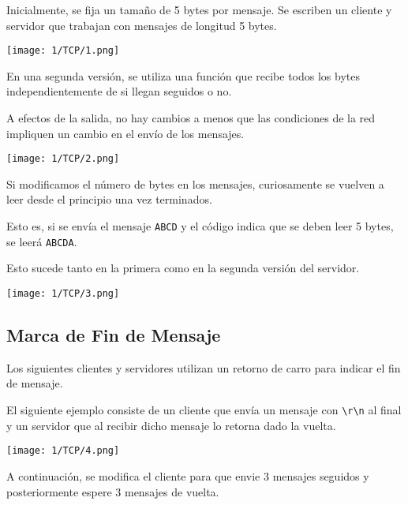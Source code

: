 Inicialmente, se fija un tamaño de 5 bytes por mensaje.
Se escriben un cliente y servidor que trabajan con mensajes de longitud 5 bytes.

\begin{minipage}{\linewidth}
	\centering
	\texttt{[image: 1/TCP/1.png]}
	\label{fig:1/4}
\end{minipage}

En una segunda versión, se utiliza una función que recibe todos los bytes
independientemente de si llegan seguidos o no.

A efectos de la salida, no hay cambios a menos que las condiciones de la red
impliquen un cambio en el envío de los mensajes.

\begin{minipage}{\linewidth}
	\centering
	\texttt{[image: 1/TCP/2.png]}
	\label{fig:1/5}
\end{minipage}

Si modificamos el número de bytes en los mensajes,
curiosamente se vuelven a leer desde el principio una vez terminados.

Esto es, si se envía el mensaje \verb#ABCD# y el código indica que se deben leer
5 bytes, se leerá \verb#ABCDA#.

Esto sucede tanto en la primera como en la segunda versión del servidor.

\begin{minipage}{\linewidth}
	\centering
	\texttt{[image: 1/TCP/3.png]}
	\label{fig:1/5}
\end{minipage}

\subsection{Marca de Fin de Mensaje}

Los siguientes clientes y servidores utilizan un retorno de carro
para indicar el fin de mensaje.

El siguiente ejemplo consiste de un cliente que envía un mensaje
con \verb#\r\n# al final
y un servidor que al recibir dicho mensaje lo retorna dado la vuelta.

\begin{minipage}{\linewidth}
	\centering
	\texttt{[image: 1/TCP/4.png]}
	\label{fig:1/6}
\end{minipage}

A continuación, se modifica el cliente para que envie 3 mensajes
seguidos y posteriormente espere 3 mensajes de vuelta.

